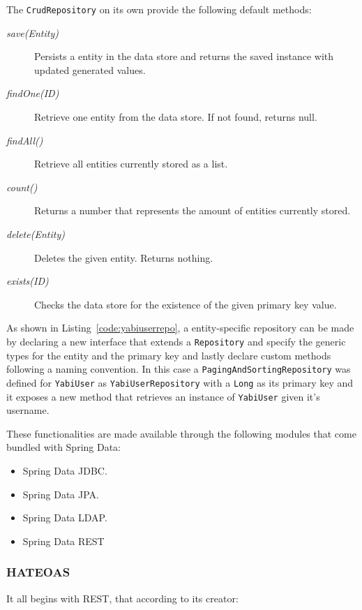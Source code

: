 The \texttt{CrudRepository} on its own provide the following default methods:

\begin{description}
\item[\textit{save(Entity)}] Persists a entity in the data store and returns the saved instance with updated generated values.
\item[\textit{findOne(ID)}] Retrieve one entity from the data store. If not found, returns null.
\item[\textit{findAll()}] Retrieve all entities currently stored as a list.
\item[\textit{count()}] Returns a number that represents the amount of entities currently stored.
\item[\textit{delete(Entity)}] Deletes the given entity. Returns nothing.
\item[\textit{exists(ID)}] Checks the data store for the existence of the given primary key value.
\end{description}

As shown in Listing~\ref{code:yabiuserrepo}, a entity-specific repository can be made by declaring a new interface that extends a \texttt{Repository} and specify the generic types for the entity and the primary key and lastly declare custom methods following a naming convention. In this case a \texttt{PagingAndSortingRepository} was defined for \texttt{YabiUser} as \texttt{YabiUserRepository} with a \texttt{Long} as its primary key and it exposes a new method that retrieves an instance of \texttt{YabiUser} given it's username.



These functionalities are made available through the following modules that come bundled with Spring Data:

\begin{itemize}
\item Spring Data \gls{JDBC}.
\item Spring Data \gls{JPA}.
\item Spring Data \gls{LDAP}.
\item Spring Data \gls{REST}
\end{itemize}

\subsubsection{\gls{HATEOAS}}
It all begins with \gls{REST}, that according to its creator:

